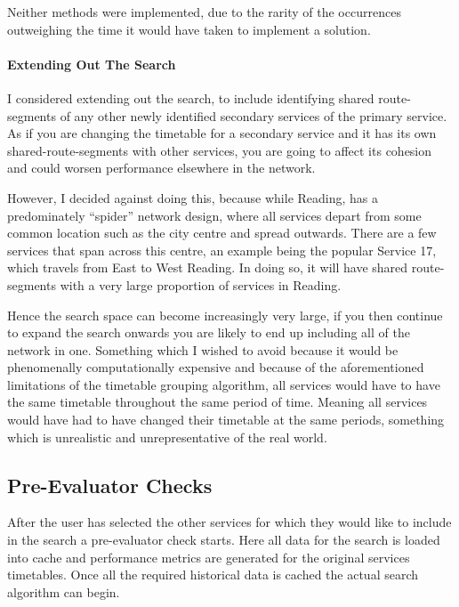 \documentclass{article}
\begin{document}
\par 
Neither methods were implemented, due to the rarity of the occurrences outweighing the time it would have taken to implement a solution.


\paragraph{Extending Out The Search}
I considered extending out the search, to include identifying shared route-segments of any other newly identified secondary services of the primary service. As if you are changing the timetable for a secondary service and it has its own shared-route-segments with other services, you are going to affect its cohesion and could worsen performance elsewhere in the network. 

\par 
However, I decided against doing this, because while Reading, has a predominately ``spider'' network design, where all services depart from some common location such as the city centre and spread outwards. There are a few services that span across this centre, an example being the popular Service 17, which travels from East to West Reading. In doing so, it will have shared route-segments with a very large proportion of services in Reading. 

\par 
Hence the search space can become increasingly very large, if you then continue to expand the search onwards you are likely to end up including all of the network in one. Something which I wished to avoid because it would be phenomenally computationally expensive and because of the aforementioned limitations of the timetable grouping algorithm, all services would have to have the same timetable throughout the same period of time. Meaning all services would have had to have changed their timetable at the same periods, something which is unrealistic and unrepresentative of the real world.



\subsection{Pre-Evaluator Checks}
After the user has selected the other services for which they would like to include in the search a pre-evaluator check starts. Here all data for the search is loaded into cache and performance metrics are generated for the original services timetables. Once all the required historical data is cached the actual search algorithm can begin.
\end{document}
